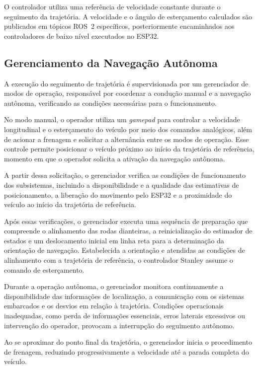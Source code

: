 O controlador utiliza uma referência de velocidade constante durante o seguimento da trajetória. A velocidade e o ângulo de esterçamento calculados são publicados em tópicos ROS~2 específicos, posteriormente encaminhados aos controladores de baixo nível executados no ESP32.

\subsection{Gerenciamento da Navegação Autônoma}
\label{subsec:gerenciamento_navegacao}

A execução do seguimento de trajetória é supervisionada por um gerenciador de modos de operação, responsável por coordenar a condução manual e a navegação autônoma, verificando as condições necessárias para o funcionamento.

No modo manual, o operador utiliza um \textit{gamepad} para controlar a velocidade longitudinal e o esterçamento do veículo por meio dos comandos analógicos, além de acionar a frenagem e solicitar a alternância entre os modos de operação. Esse controle permite posicionar o veículo próximo ao início da trajetória de referência, momento em que o operador solicita a ativação da navegação autônoma.

A partir dessa solicitação, o gerenciador verifica as condições de funcionamento dos subsistemas, incluindo a disponibilidade e a qualidade das estimativas de posicionamento, a liberação do movimento pelo ESP32 e a proximidade do veículo ao início da trajetória de referência.

Após essas verificações, o gerenciador executa uma sequência de preparação que compreende o alinhamento das rodas dianteiras, a reinicialização do estimador de estados e um deslocamento inicial em linha reta para a determinação da orientação de navegação. Estabelecida a orientação e atendidas as condições de alinhamento com a trajetória de referência, o controlador Stanley assume o comando de esterçamento.

Durante a operação autônoma, o gerenciador monitora continuamente a disponibilidade das informações de localização, a comunicação com os sistemas embarcados e os desvios em relação à trajetória. Condições operacionais inadequadas, como perda de informações essenciais, erros laterais excessivos ou intervenção do operador, provocam a interrupção do seguimento autônomo.

Ao se aproximar do ponto final da trajetória, o gerenciador inicia o procedimento de frenagem, reduzindo progressivamente a velocidade até a parada completa do veículo.